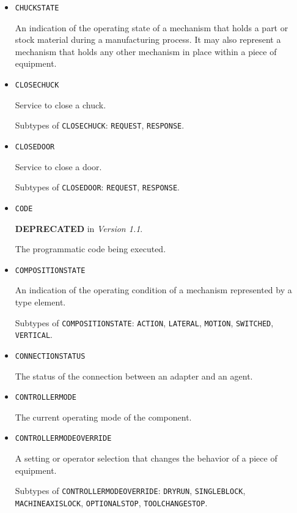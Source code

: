 \begin{itemize}
\item \texttt{CHUCK\textunderscore STATE}  

An indication of the operating state of a mechanism that holds a part or stock material during a manufacturing process. It may also represent a mechanism that holds any other mechanism in place within a piece of equipment.


\item \texttt{CLOSE\textunderscore CHUCK}  

Service to close a chuck.

Subtypes of \texttt{CLOSE\textunderscore CHUCK}: \texttt{REQUEST}, \texttt{RESPONSE}.

\item \texttt{CLOSE\textunderscore DOOR}  

Service to close a door.

Subtypes of \texttt{CLOSE\textunderscore DOOR}: \texttt{REQUEST}, \texttt{RESPONSE}.

\item \texttt{CODE}  

\textbf{DEPRECATED} in \textit{Version 1.1}.

The programmatic code being executed.


\item \texttt{COMPOSITION\textunderscore STATE}  

An indication of the operating condition of a mechanism represented by a  type element.

Subtypes of \texttt{COMPOSITION\textunderscore STATE}: \texttt{ACTION}, \texttt{LATERAL}, \texttt{MOTION}, \texttt{SWITCHED}, \texttt{VERTICAL}.

\item \texttt{CONNECTION\textunderscore STATUS}  

The status of the connection between an \gls{adapter} and an \gls{agent}.


\item \texttt{CONTROLLER\textunderscore MODE}  

The current operating mode of the  component.


\item \texttt{CONTROLLER\textunderscore MODE\textunderscore OVERRIDE}  

A setting or operator selection that changes the behavior of a piece of equipment.

Subtypes of \texttt{CONTROLLER\textunderscore MODE\textunderscore OVERRIDE}: \texttt{DRY\textunderscore RUN}, \texttt{SINGLE\textunderscore BLOCK}, \texttt{MACHINE\textunderscore AXIS\textunderscore LOCK}, \texttt{OPTIONAL\textunderscore STOP}, \texttt{TOOL\textunderscore CHANGE\textunderscore STOP}.


\end{itemize}
